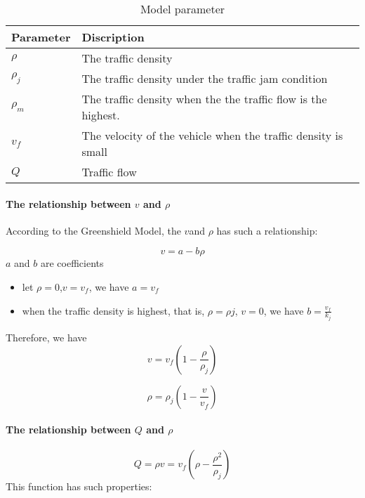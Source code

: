 \begin{table}
\centering
\begin{tabular}{ll}
\hline
Parameter & Discription\\
\hline
$\rho $ & The traffic density\\
$\rho_j$ & The traffic density under the traffic jam condition\\
$\rho_m$ & The traffic density when the the traffic flow is the highest.\\
$v_f$ & The velocity of the vehicle when the traffic density is small \\
$Q$ & Traffic flow \\
\hline
\end{tabular}
\caption{Model parameter}
\end{table}


\paragraph{The relationship between $v$ and $\rho$ }
According to the Greenshield Model, the $v $and $\rho$ has such a 
relationship:

\begin{equation}
v = a - b\rho
\end{equation}
$a$ and $b$ are coefficients

\begin{itemize}
\item let $\rho = 0$,$v = v_f$,
we have $a = v_f$
\\
\item when the traffic density is highest, that is,
$\rho = \rho j$, $v = 0$,
we have $b = \frac{v_f}{k_j}$
\end{itemize}

Therefore, we have 
\begin{equation}
v = v_f(1 - \frac{\rho}{\rho_j})
\end{equation}

\begin{equation}
\rho = \rho_j(1 - \frac{v}{v_f})
\end {equation}

\paragraph{The relationship between $Q$ and $\rho$ }
\begin{equation}
Q = \rho v = v_f(\rho - \frac{\rho^2}{\rho_j})
\end{equation}
This function has such properties:

